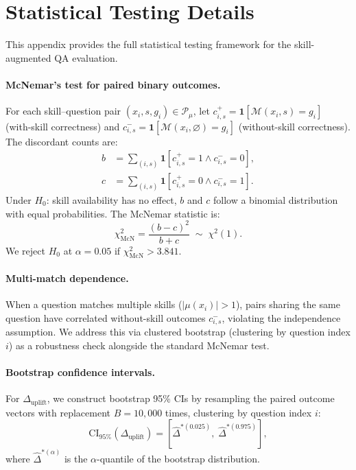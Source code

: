 \section{Statistical Testing Details}
\label{app:statistical_details}

This appendix provides the full statistical testing framework for the skill-augmented QA evaluation.

\paragraph{McNemar's test for paired binary outcomes.}
For each skill--question pair $(x_i, s, g_i) \in \mathcal{P}_\mu$, let $c_{i,s}^{+} = \mathbf{1}[\mathcal{M}(x_i, s) = g_i]$ (with-skill correctness) and $c_{i,s}^{-} = \mathbf{1}[\mathcal{M}(x_i, \varnothing) = g_i]$ (without-skill correctness).
The discordant counts are:
\begin{equation}
\begin{aligned}
b &= \sum_{(i,s)} \mathbf{1}[c_{i,s}^{+} = 1 \wedge c_{i,s}^{-} = 0], \\
c &= \sum_{(i,s)} \mathbf{1}[c_{i,s}^{+} = 0 \wedge c_{i,s}^{-} = 1].
\end{aligned}
\label{eq:mcnemar_counts}
\end{equation}
Under $H_0$: skill availability has no effect, $b$ and $c$ follow a binomial distribution with equal probabilities.
The McNemar statistic is:
\begin{equation}
\chi^2_{\text{McN}} = \frac{(b - c)^2}{b + c} \;\sim\; \chi^2(1).
\label{eq:mcnemar_stat}
\end{equation}
We reject $H_0$ at $\alpha = 0.05$ if $\chi^2_{\text{McN}} > 3.841$.

\paragraph{Multi-match dependence.}
When a question matches multiple skills ($|\mu(x_i)| > 1$), pairs sharing the same question have correlated without-skill outcomes $c_{i,s}^{-}$, violating the independence assumption.
We address this via clustered bootstrap (clustering by question index $i$) as a robustness check alongside the standard McNemar test.

\paragraph{Bootstrap confidence intervals.}
For $\Delta_{\text{uplift}}$, we construct bootstrap 95\% CIs by resampling the paired outcome vectors with replacement $B = 10{,}000$ times, clustering by question index $i$:
\begin{equation}
\text{CI}_{95\%}(\Delta_{\text{uplift}}) = \left[\hat{\Delta}^{*(0.025)}, \;\hat{\Delta}^{*(0.975)}\right],
\label{eq:bootstrap_ci}
\end{equation}
where $\hat{\Delta}^{*(\alpha)}$ is the $\alpha$-quantile of the bootstrap distribution.

